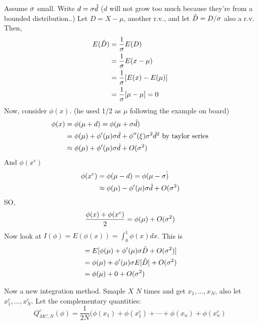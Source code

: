 Assume $\sigma$ small. Write $d = \sigma \hat d$ ($d$ will not grow too
much because they're from a bounded distribution..) Let $D = X - \mu$,
another r.v., and let $\hat D = D/\sigma$ also a r.v. Then,
\begin{align*}
E(\hat D) &= \frac{1}{\sigma}E(D)\\
&= \frac{1}{\sigma}E(x-\mu)  \\
&=\frac{1}{\sigma}[E(x) - E(\mu)] \\
&=\frac{1}{\sigma}[\mu-\mu] = 0
\end{align*}
Now, consider $\phi(x)$. (he used 1/2 as $\mu$ following the example on board)
\begin{align*}
\phi(x) &= \phi(\mu + d) = \phi(\mu + \sigma\hat d)\\
&= \phi(\mu) +   \phi'(\mu)\sigma \hat d + \phi''(\xi)\sigma^2 \hat d^2
\text{ by taylor series}\\
&\approx \phi(\mu) +   \phi'(\mu)\sigma \hat d + O(\sigma^2)\\
\end{align*}
And $\phi(x^c)$
\begin{align*}
  \phi(x^c) &= \phi(\mu - d) = \phi(\mu - \sigma \hat) \\
&\approx \phi(\mu) - \phi'(\mu)\sigma\hat d +  O(\sigma^2)
\end{align*}
SO, 
$$\frac{\phi(x)+\phi(x^c)}{2} = \phi(\mu) + O(\sigma^2)$$
Now look at $I(\phi) = E(\phi(x)) = \int_0^1\phi(x)dx$. This is
\begin{align*}
 &=E[\phi(\mu) + \phi'(\mu)\sigma \hat D + O(\sigma^2)]\\
&=\phi(\mu) + \phi'(\mu)\sigma E[\hat D] + O(\sigma^2)\\
&=\phi(\mu) + 0 + O(\sigma^2)
\end{align*}

Now a new integration method. Smaple $X$ $N$ times and get $x_1,
\dots, x_N$, also let $x^c_1,\dots, x^c_N$. Let the complementary
quantities:
$$
Q^c_{MC,N}(\phi) =  \frac{1}{2N}(\phi(x_1) + \phi(x_1^c) + \cdots +
\phi(x_n) + \phi(x_n^c)
$$

